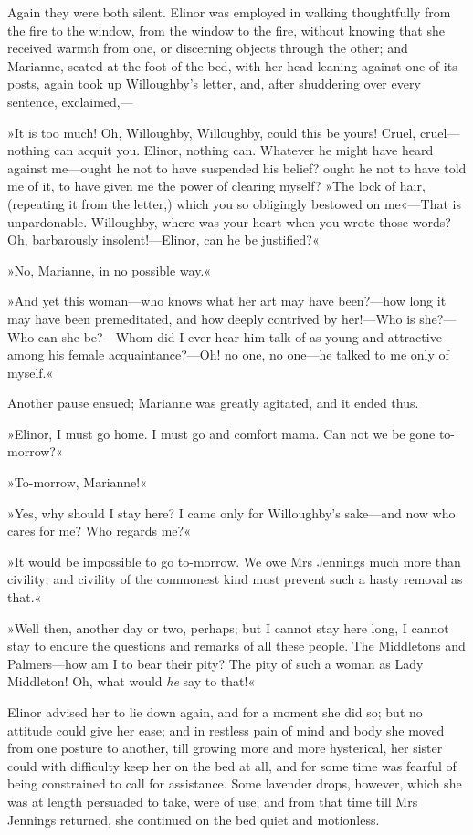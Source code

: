 Again they were both silent. Elinor was employed in walking thoughtfully from the fire to the window, from the window to the fire, without knowing that she received warmth from one, or discerning objects through the other; and Marianne, seated at the foot of the bed, with her head leaning against one of its posts, again took up Willoughby’s letter, and, after shuddering over every sentence, exclaimed,—

»It is too much! Oh, Willoughby, Willoughby, could this be yours! Cruel, cruel—nothing can acquit you. Elinor, nothing can. Whatever he might have heard against me—ought he not to have suspended his belief? ought he not to have told me of it, to have given me the power of clearing myself? »The lock of hair, (repeating it from the letter,) which you so obligingly bestowed on me«—That is unpardonable. Willoughby, where was your heart when you wrote those words? Oh, barbarously insolent!—Elinor, can he be justified?«

»No, Marianne, in no possible way.«

»And yet this woman—who knows what her art may have been?—how long it may have been premeditated, and how deeply contrived by her!—Who is she?—Who can she be?—Whom did I ever hear him talk of as young and attractive among his female acquaintance?—Oh! no one, no one—he talked to me only of myself.«

Another pause ensued; Marianne was greatly agitated, and it ended thus.

»Elinor, I must go home. I must go and comfort mama. Can not we be gone to-morrow?«

»To-morrow, Marianne!«

»Yes, why should I stay here? I came only for Willoughby’s sake—and now who cares for me? Who regards me?«

»It would be impossible to go to-morrow. We owe Mrs Jennings much more than civility; and civility of the commonest kind must prevent such a hasty removal as that.«

»Well then, another day or two, perhaps; but I cannot stay here long, I cannot stay to endure the questions and remarks of all these people. The Middletons and Palmers—how am I to bear their pity? The pity of such a woman as Lady Middleton! Oh, what would \textit{he} say to that!«

Elinor advised her to lie down again, and for a moment she did so; but no attitude could give her ease; and in restless pain of mind and body she moved from one posture to another, till growing more and more hysterical, her sister could with difficulty keep her on the bed at all, and for some time was fearful of being constrained to call for assistance. Some lavender drops, however, which she was at length persuaded to take, were of use; and from that time till Mrs Jennings returned, she continued on the bed quiet and motionless.